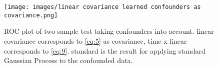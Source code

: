 \documentclass[11pt,a4paper,titlepage,twoside,tablecaptionabove]{article}
\begin{document}
\begin{figure}[tps]
  \centering
  \texttt{[image: images/linear covariance learned confounders as covariance.png]}
  \caption{ROC plot of two-sample test taking confounders into
    account. linear covariance corresponds to \eqref{eq:5} as
    covariance, time x linear corresponds to \eqref{eq:9}. standard is
    the result for applying standard Gaussian Process to the
    confounded data.\label{fig:ROC_linear}}
\end{figure}

 
\end{document}

